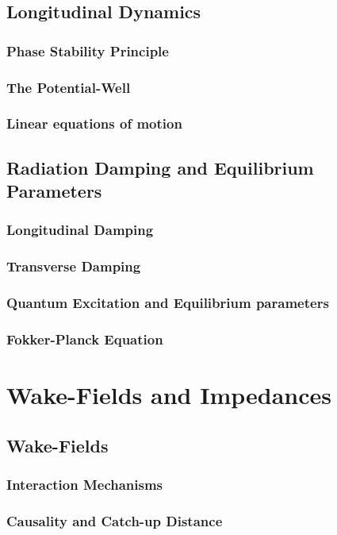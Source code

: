 \documentclass[
	12pt,				%
	openright,			%
	oneside,			%
	a4paper,		%
	chapter=TITLE,		%
	section=TITLE,		%
    brazil,				%
	english,			%
	sumario=tradicional,
	]{abntex2}
\begin{document}
  \section{Longitudinal Dynamics}
    \subsection{Phase Stability Principle}
    \subsection{The Potential-Well}
    \subsection{Linear equations of motion}
  \section{Radiation Damping and Equilibrium Parameters}
    \subsection{Longitudinal Damping}
    \subsection{Transverse Damping}
    \subsection{Quantum Excitation and Equilibrium parameters}
    \subsection{Fokker-Planck Equation}

\chapter{Wake-Fields and Impedances}
  \section{Wake-Fields}
    \subsection{Interaction Mechanisms}
    \subsection{Causality and Catch-up Distance}
\end{document}
